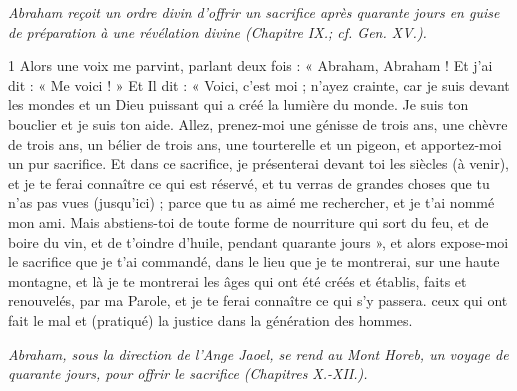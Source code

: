 
\par \textit{Abraham reçoit un ordre divin d'offrir un sacrifice après quarante jours en guise de préparation à une révélation divine (Chapitre IX.; cf. Gen. XV.).}

\par 1 Alors une voix me parvint, parlant deux fois : « Abraham, Abraham ! Et j’ai dit : « Me voici ! » Et Il dit : « Voici, c’est moi ; n'ayez crainte, car je suis devant les mondes et un Dieu puissant qui a créé la lumière du monde. Je suis ton bouclier et je suis ton aide. Allez, prenez-moi une génisse de trois ans, une chèvre de trois ans, un bélier de trois ans, une tourterelle et un pigeon, et apportez-moi un pur sacrifice. Et dans ce sacrifice, je présenterai devant toi les siècles (à venir), et je te ferai connaître ce qui est réservé, et tu verras de grandes choses que tu n'as pas vues (jusqu'ici) ; parce que tu as aimé me rechercher, et je t'ai nommé mon ami. Mais abstiens-toi de toute forme de nourriture qui sort du feu, et de boire du vin, et de t'oindre d'huile, pendant quarante jours », et alors expose-moi le sacrifice que je t'ai commandé, dans le lieu que je te montrerai, sur une haute montagne, et là je te montrerai les âges qui ont été créés et établis, faits et renouvelés, par ma Parole, et je te ferai connaître ce qui s'y passera. ceux qui ont fait le mal et (pratiqué) la justice dans la génération des hommes.


\par \textit{Abraham, sous la direction de l'Ange Jaoel, se rend au Mont Horeb, un voyage de quarante jours, pour offrir le sacrifice (Chapitres X.-XII.).}

